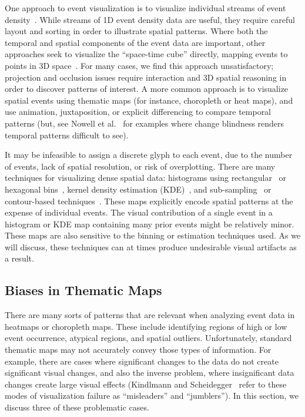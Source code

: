 \documentclass[journal]{vgtc}                %
\begin{document}
One approach to event visualization is to visualize individual streams of event density~\cite{beard2008framework, krstajic2011cloudlines}. While streams of 1D event density data are useful, they require careful layout and sorting in order to illustrate spatial patterns. Where both the temporal and spatial components of the event data are important, other approaches seek to visualize the ``space-time cube'' \cite{bach2014review} directly, mapping events to points in 3D space~\cite{gatalsky2004interactive, tominski20053d}. For many cases, we find this approach unsatisfactory; projection and occlusion issues require interaction and 3D spatial reasoning in order to discover patterns of interest. A more common approach is to visualize spatial events using thematic maps (for instance, choropleth or heat maps), and use animation, juxtaposition, or explicit differencing to compare temporal patterns \cite{gatalsky2004interactive} (but, see Nowell et al.~\cite{nowell2001change} for examples where change blindness renders temporal patterns difficult to see).

It may be infeasible to assign a discrete glyph to each event, due to the number of events, lack of spatial resolution, or risk of overplotting. There are many techniques for visualizing dense spatial data: histograms using rectangular~\cite{fisher2007hotmap, liu2013immens} or hexagonal bins~\cite{carr2010hexbin}, kernel density estimation (KDE)~\cite{scott2008kernel}, and sub-sampling~\cite{chen2014visual} or contour-based techniques~\cite{mayorga2013splatterplots}. These maps explicitly encode spatial patterns at the expense of individual events. The visual contribution of a single event in a histogram or KDE map containing many prior events might be relatively minor. These maps are also sensitive to the binning or estimation techniques used. As we will discuss, these techniques can at times produce undesirable visual artifacts as a result.

\subsection{Biases in Thematic Maps}
\label{sec:biases}

There are many sorts of patterns that are relevant when analyzing event data in heatmaps or choropleth maps. These include identifying regions of high or low event occurrence, atypical regions, and spatial outliers. Unfortunately, standard thematic maps may not accurately convey those types of information. For example, there are cases where significant changes to the data do not create significant visual changes, and also the inverse problem, where insignificant data changes create large visual effects (Kindlmann and Scheidegger~\cite{kindlmann2014algebraic} refer to these modes of visualization failure as ``misleaders'' and ``jumblers''). In this section, we discuss three of these problematic cases.
\end{document}
